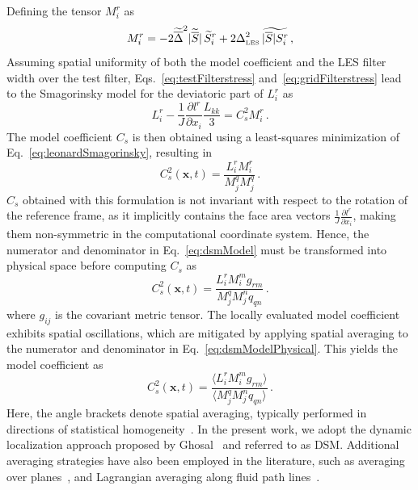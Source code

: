 \documentclass[final,3p]{elsarticle}
\begin{document}
Defining the tensor $M^r_i$ as 
\begin{equation}
    M^r_i = -2 \widetilde{\overline{\Delta}}^2 |\widetilde{\overline{S}}| \, \widetilde{S}^r_i
    + 2 \Delta_{\text{\tiny LES}}^2 \, \widetilde{|\overline{S}| S^r_i} \, ,
\end{equation}
Assuming spatial uniformity of both the model coefficient and the LES filter width over the test filter, Eqs.~\ref{eq:testFilterstress} and~\ref{eq:gridFilterstress} lead to the Smagorinsky model for the deviatoric part of $L^r_i$ as
\begin{equation}
    L^r_i- \frac{1}{J} \frac{\partial l^r}{\partial x_i} \frac{L_{kk}}{3} =  C_s^2 M^r_i\, .
    \label{eq:leonardSmagorinsky}
\end{equation}
The model coefficient \( C_s \) is then obtained using a least-squares minimization of Eq.~\ref{eq:leonardSmagorinsky}, resulting in
\begin{equation}
    C_s^2(\mathbf{x}, t)  = \frac{L^r_i M^r_i}{M^q_j M^q_j} \, .
    \label{eq:dsmModel}
\end{equation}
$C_s$ obtained with this formulation is not invariant with respect to the rotation of the reference frame, as it implicitly contains the face area vectors $\frac{1}{J} \frac{\partial l^r}{\partial x_i} $, making them non-symmetric in the computational coordinate system. Hence, the numerator and denominator in Eq.~\ref{eq:dsmModel} must be transformed into physical space before computing $C_s$ as 
\begin{equation}
    C_s^2(\mathbf{x}, t)  = \frac{L^r_i M^m_i g_{rm}}{M^q_j M^n_j q_{qn}} \, .
    \label{eq:dsmModelPhysical}
\end{equation}
where $g_{ij}$ is the covariant metric tensor. The locally evaluated model coefficient exhibits spatial oscillations, which are mitigated by applying spatial averaging to the numerator and denominator in Eq.~\ref{eq:dsmModelPhysical}. This yields the model coefficient as
\begin{equation}
    C_s^2(\mathbf{x}, t)  = \frac{\langle L^r_i M^m_i g_{rm}\rangle}{\langle M^q_j M^n_j q_{qn}\rangle} \, .
    \label{eq:CsCoeff}
\end{equation}
Here, the angle brackets denote spatial averaging, typically performed in directions of statistical homogeneity~\cite{germano1991dynamic}. In the present work, we adopt the dynamic localization approach proposed by Ghosal~\cite{ghosal1995dynamic} and referred to as DSM. Additional averaging strategies have also been employed in the literature, such as averaging over planes~\cite{porte2000scale}, and Lagrangian averaging along fluid path lines~\cite{meneveau1996lagrangian}. 
\end{document}
